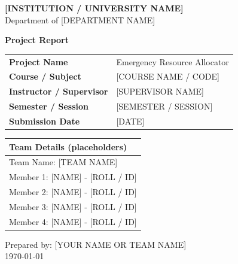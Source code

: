 \documentclass[12pt,a4paper]{report}
\begin{document}
\begin{titlepage}
  \begin{center}
    \vspace*{0.5cm}
    {\Large \textbf{[INSTITUTION / UNIVERSITY NAME]}}\\[0.3cm]
    {\large Department of [DEPARTMENT NAME]}\\[1.2cm]


    \vspace{1.1cm}
    {\Large \textbf{Project Report}}\\[0.7cm]

    \renewcommand{\arraystretch}{1.3}
    \begin{tabular}{>{\bfseries}p{4cm} p{8cm}}
      Project Name & Emergency Resource Allocator \\
      Course / Subject & [COURSE NAME / CODE] \\
      Instructor / Supervisor & [SUPERVISOR NAME] \\
      Semester / Session & [SEMESTER / SESSION] \\
      Submission Date & [DATE] \\
    \end{tabular}

    \vspace{0.9cm}
    \begin{tabular}{|p{12.2cm}|}
      \hline
      \textbf{Team Details (placeholders)} \\
      \hline
      Team Name: [TEAM NAME] \\ 
      Member 1: [NAME] - [ROLL / ID] \\ 
      Member 2: [NAME] - [ROLL / ID] \\ 
      Member 3: [NAME] - [ROLL / ID] \\ 
      Member 4: [NAME] - [ROLL / ID] \\ 
      \hline
    \end{tabular}

    \vfill
    {\large Prepared by: [YOUR NAME OR TEAM NAME]}\\[0.3cm]
    {\large \today}
  \end{center}
\end{titlepage}
\end{document}
